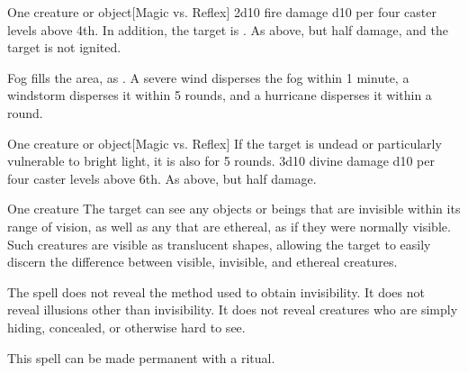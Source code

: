 \spellrng{\rngclose}
\spelldur{\durshort}
\begin{spelltarget}{One creature or object}[Magic vs. Reflex]
    \spellsuccess 2d10 fire damage \add d10 per four caster levels above 4th. In addition, the target is \ignited.
    \spellfailure As above, but half damage, and the target is not ignited.
\end{spelltarget}

\spellline
\spelleffect Fog fills the area, as .
\spellnotes \fogspellnotes A severe wind disperses the fog within 1 minute, a windstorm disperses it within 5 rounds, and a hurricane disperses it within a round.

\spellrng{\rngclose}
\begin{spelltarget}{One creature or object}[Magic vs. Reflex]
    \spelleffect If the target is undead or particularly vulnerable to bright light, it is also \dazzled for 5 rounds.
    \spellsuccess 3d10 divine damage \add d10 per four caster levels above 6th.
    \spellfailure As above, but half damage.
\end{spelltarget}

\spelldur{\durlong \dismissable}
\begin{spelltarget}{One creature}
    \spelleffect The target can see any objects or beings that are invisible within its range of vision, as well as any that are ethereal, as if they were normally visible. Such creatures are visible as translucent shapes, allowing the target to easily discern the difference between visible, invisible, and ethereal creatures.
\end{spelltarget}
\spellnotes The spell does not reveal the method used to obtain invisibility. It does not reveal illusions other than invisibility. It does not reveal creatures who are simply hiding, concealed, or otherwise hard to see.

This spell can be made permanent with a  ritual.

